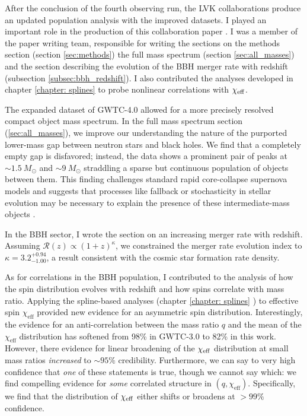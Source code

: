 \begin{refsection}
After the conclusion of the fourth observing run, the \ac{LVK} collaborations produce an updated population analysis with the improved datasets. I played an important role in the production of this collaboration paper \citep{abac_gwtc-40_2025}. I was a member of the paper writing team, responsible for writing the sections on the methods section (section \ref{sec:methods}) the full mass spectrum (section \ref{sec:all_masses}) and the section describing the evolution of the \ac{BBH} merger rate with redshift (subsection \ref{subsec:bbh_redshift}). I also contributed the analyses developed in chapter \ref{chapter: splines} to probe nonlinear correlations with $\chi_{\rm eff}$. 

The expanded dataset of GWTC-4.0 allowed for a more precisely resolved compact object mass spectrum. In the full mass spectrum section (\ref{sec:all_masses}), we improve our understanding the nature of the purported lower-mass gap between neutron stars and black holes. We find that a completely empty gap is disfavored; instead, the data shows a prominent pair of peaks at $\sim1.5~M_{\odot}$ and $\sim9~M_{\odot}$ straddling a sparse but continuous population of objects between them. This finding challenges standard rapid core-collapse supernova models and suggests that processes like fallback or stochasticity in stellar evolution may be necessary to explain the presence of these intermediate-mass objects \citep{Fryer:1999ht,Fryer:2011cx,Belczynski:2011bn,Sukhbold:2015wba,Ertl:2019zks,Mandel:2020qwb,Burrows:2020qrp,Olejak:2022zee,Fryer:2022lla}. 

In the BBH sector, I wrote the section on an increasing merger rate with redshift. Assuming $\mathcal{R}(z) \propto (1+z)^\kappa$, we constrained the merger rate evolution index to $\kappa=3.2_{-1.00}^{+0.94}$, a result consistent with the cosmic star formation rate density. 

As for correlations in the \ac{BBH} population, I contributed to the analysis of how the spin distribution evolves with redshift and how spins correlate with mass ratio. Applying the spline-based analyses (chapter \ref{chapter: splines} \citep{Heinzel:2023hlb}) to effective spin $\chi_{\text{eff}}$ provided new evidence for an asymmetric spin distribution. Interestingly, the evidence for an anti-correlation between the mass ratio $q$ and the mean of the $\chi_{\text{eff}}$ distribution has softened from 98\% in GWTC-3.0 to 82\% in this work. However, there evidence for linear broadening of the $\chi_{\rm eff}$ distribution at small mass ratios \textit{increased} to $\sim95\%$ credibility. Furthermore, we can say to very high confidence that \textit{one} of these statements is true, though we cannot say which: we find compelling evidence for \textit{some} correlated structure in $(q, \chi_{\text{eff}})$. Specifically, we find that the distribution of $\chi_{\rm eff}$ either shifts or broadens at $>99\%$ confidence. 


\end{refsection}
